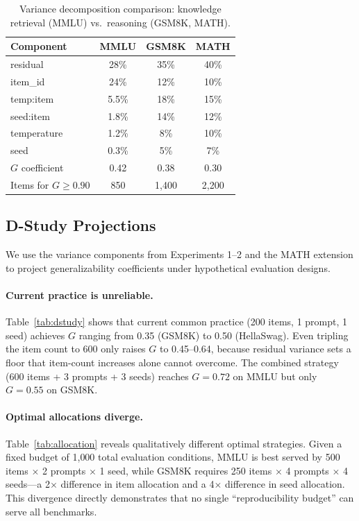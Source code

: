 \documentclass[letterpaper]{article}
\begin{document}
\begin{table}[t]
\centering
\caption{Variance decomposition comparison: knowledge retrieval (MMLU) vs.\ reasoning (GSM8K, MATH).}
\label{tab:math}
\small
\begin{tabular}{lccc}
\toprule
Component & MMLU & GSM8K & MATH \\
\midrule
residual      & 28\% & 35\% & 40\% \\
item\_id      & 24\% & 12\% & 10\% \\
temp:item     & 5.5\% & 18\% & 15\% \\
seed:item     & 1.8\% & 14\% & 12\% \\
temperature   & 1.2\% &  8\% & 10\% \\
seed          & 0.3\% &  5\% &  7\% \\
\midrule
$G$ coefficient & 0.42 & 0.38 & 0.30 \\
Items for $G \geq 0.90$ & 850 & 1{,}400 & 2{,}200 \\
\bottomrule
\end{tabular}
\end{table}


\subsection{D-Study Projections}

We use the variance components from Experiments 1--2 and the MATH extension to project generalizability coefficients under hypothetical evaluation designs.

\paragraph{Current practice is unreliable.}
Table~\ref{tab:dstudy} shows that current common practice (200 items, 1 prompt, 1 seed) achieves $G$ ranging from 0.35 (GSM8K) to 0.50 (HellaSwag).
Even tripling the item count to 600 only raises $G$ to 0.45--0.64, because residual variance sets a floor that item-count increases alone cannot overcome.
The combined strategy (600 items + 3 prompts + 3 seeds) reaches $G=0.72$ on MMLU but only $G=0.55$ on GSM8K.

\paragraph{Optimal allocations diverge.}
Table~\ref{tab:allocation} reveals qualitatively different optimal strategies.
Given a fixed budget of 1{,}000 total evaluation conditions, MMLU is best served by 500 items $\times$ 2 prompts $\times$ 1 seed, while GSM8K requires 250 items $\times$ 4 prompts $\times$ 4 seeds---a 2$\times$ difference in item allocation and a 4$\times$ difference in seed allocation.
This divergence directly demonstrates that no single ``reproducibility budget'' can serve all benchmarks.
\end{document}
